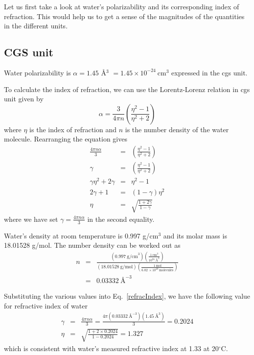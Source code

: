 \documentclass[aps, 12pt, amsmath, amssymb, onecolumn, notitlepage, nofootinbib]{revtex4-1}
\begin{document}
Let us first take a look at water's polarizability and its corresponding index of refraction. This would help us to get a sense of the magnitudes of the quantities in the different units.

\subsection{CGS unit}

 Water polarizability is $\alpha = 1.45$ \AA$^3$ $= 1.45 \times 10^{-24}\ \text{cm}^3$ expressed in the cgs unit.

 To calculate the index of refraction, we can use the Lorentz-Lorenz relation in cgs unit given by
\begin{equation}
\alpha = \frac{3}{4\pi n} \left( \frac{\eta^2 - 1 }{\eta^2 +2} \right)
\end{equation}
where $\eta$ is the index of refraction and $n$ is the number density of the water molecule. Rearranging the equation gives
\begin{eqnarray}
\frac{4\pi n\alpha}{3} &=&   \left( \frac{\eta^2 - 1 }{\eta^2 +2} \right) \nonumber\\
\gamma &=&   \left( \frac{\eta^2 - 1 }{\eta^2 +2} \right) \nonumber\\
\gamma\eta^2 +2\gamma &=&  \eta^2 - 1\nonumber\\
2\gamma + 1 &=&  (1-\gamma) \eta^2\nonumber\\ 
\eta &=&  \sqrt{\frac{1 + 2\gamma}{1-\gamma}}
\label{refracIndex}
\end{eqnarray}
where we have set $\gamma = \frac{4\pi n\alpha}{3}$ in the second equality. 


Water's density at room temperature is 0.997 g/cm$^3$ and its molar mass is 18.01528 g/mol. The number density can be worked out as
\begin{eqnarray}
n &=&  \frac{(0.997\ \text{g/cm}^3) \left( \frac{1\ \text{cm}^3}{10^{24}\ \text{\AA}^3} \right)}{(18.01528\ \text{g/mol}) \left( \frac{1\ \text{mol}}{6.02\ \times 10^{23}\ \text{molecules} }\right)}\nonumber\\
&=& 0.03332\ \text{\AA}^{-3}
\label{numberDenisty}
\end{eqnarray}


Substituting the various values into Eq.~\eqref{refracIndex}, we have the following value for refractive index of water
\begin{eqnarray}
\gamma &=& \frac{4\pi n\alpha}{3} = \frac{4\pi (0.03332\ \text{\AA}^{-3})( 1.45\ \text{\AA}^3)}{3} =0.2024 \nonumber\\
\eta &=&  \sqrt{\frac{1 + 2\times 0.2024 }{1-0.2024}} = 1.327
\end{eqnarray}
which is consistent with water's measured refractive index at 1.33 at 20$^\circ$C.
\end{document}
